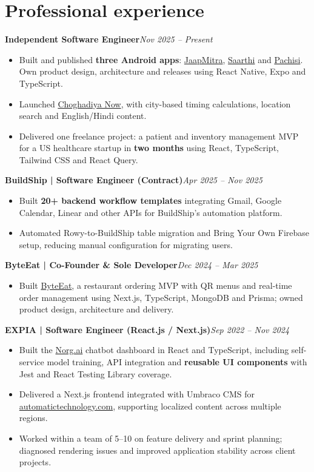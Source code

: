 \documentclass[a4paper,10pt]{article}
\newcommand{\job}[2]{\textbf{#1}\hfill\textit{#2}}
\begin{document}
\section{Professional experience}
\job{Independent Software Engineer}{Nov 2025 -- Present}
\begin{itemize}
\item Built and published \textbf{three Android apps}: \href{https://play.google.com/store/apps/details?id=com.g1mishra.jaapmitra}{JaapMitra}, \href{https://play.google.com/store/apps/details?id=com.g1mishra.saarthi}{Saarthi} and \href{https://play.google.com/store/apps/details?id=com.g1mishra.pachisi}{Pachisi}. Own product design, architecture and releases using React Native, Expo and TypeScript.
\item Launched \href{https://choghadiyanow.com/}{Choghadiya Now}, with city-based timing calculations, location search and English/Hindi content.
\item Delivered one freelance project: a patient and inventory management MVP for a US healthcare startup in \textbf{two months} using React, TypeScript, Tailwind CSS and React Query.
\end{itemize}
\job{BuildShip | Software Engineer (Contract)}{Apr 2025 -- Nov 2025}
\begin{itemize}
\item Built \textbf{20+ backend workflow templates} integrating Gmail, Google Calendar, Linear and other APIs for BuildShip's automation platform.
\item Automated Rowy-to-BuildShip table migration and Bring Your Own Firebase setup, reducing manual configuration for migrating users.
\end{itemize}
\job{ByteEat | Co-Founder \& Sole Developer}{Dec 2024 -- Mar 2025}
\begin{itemize}
\item Built \href{https://byteeat.vercel.app}{ByteEat}, a restaurant ordering MVP with QR menus and real-time order management using Next.js, TypeScript, MongoDB and Prisma; owned product design, architecture and delivery.
\end{itemize}
\job{EXPIA | Software Engineer (React.js / Next.js)}{Sep 2022 -- Nov 2024}
\begin{itemize}
\item Built the \href{https://norg.ai}{Norg.ai} chatbot dashboard in React and TypeScript, including self-service model training, API integration and \textbf{reusable UI components} with Jest and React Testing Library coverage.
\item Delivered a Next.js frontend integrated with Umbraco CMS for \href{https://www.automatictechnology.com}{automatictechnology.com}, supporting localized content across multiple regions.
\item Worked within a team of 5--10 on feature delivery and sprint planning; diagnosed rendering issues and improved application stability across client projects.
\end{itemize}
\end{document}
